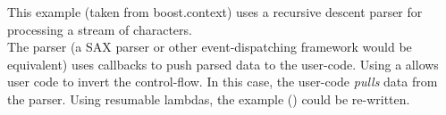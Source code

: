 \label{appendix}
This example (taken from boost.context\cite{bcontext}) uses a recursive descent
parser for processing a stream of characters.\\
The parser (a SAX parser or other event-dispatching framework would be
equivalent) uses callbacks to push parsed data to the user-code.
Using a \ectx allows user code to invert the control-flow. In this case, the
user-code \textit{pulls} data from the parser.
Using resumable lambdas, the example () could be re-written.
